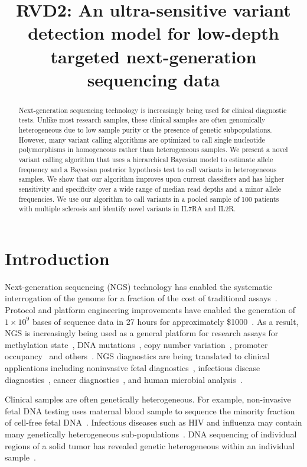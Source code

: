 \documentclass[11pt,reqno]{amsart}
\title[RVD2]{RVD2: An ultra-sensitive variant detection model for low-depth targeted next-generation sequencing data}
\author{}
\begin{document}
\begin{abstract}
Next-generation sequencing technology is increasingly being used for clinical diagnostic tests. Unlike most research samples, these clinical samples are often genomically heterogeneous due to low sample purity or the presence of genetic subpopulations. However, many variant calling algorithms are optimized to call single nucleotide polymorphisms in homogeneous rather than heterogeneous samples. We present a novel variant calling algorithm that uses a hierarchical Bayesian model to estimate allele frequency and a Bayesian posterior hypothesis test to call variants in heterogeneous samples. We show that our algorithm improves upon current classifiers and has higher sensitivity and specificity over a wide range of median read depths and a minor allele frequencies. We use our algorithm to call variants in a pooled sample of 100 patients with multiple sclerosis and identify novel variants in IL7RA and IL2R.
\end{abstract}

\maketitle

\section{Introduction}

Next-generation sequencing (NGS) technology has enabled the systematic interrogation of the genome for a fraction of the cost of traditional assays~\citep{Koboldt:2013kw}. Protocol and platform engineering improvements have enabled the generation of $1\times10^9$ bases of sequence data in 27 hours for approximately \$1000~\citep{Quail:2012hf}. As a result, NGS is increasingly being used as a general platform for research assays for methylation state~\citep{Laird:2010ab}, DNA mutations~\citep{Consortium:2013co}, copy number variation~\citep{Alkan:2009cr}, promoter occupancy~\citep{Ouyang:2009hc} and others~\citep{Rivera:2013ee}. NGS diagnostics are being translated to clinical applications including noninvasive fetal diagnostics~\citep{Kitzman:2012hea}, infectious disease diagnostics~\citep{Capobianchi:2012em}, cancer diagnostics~\citep{Navin:2010gu}, and human microbial analysis~\citep{Consortium:2013iz}. 

Clinical samples are often genetically heterogeneous. For example, non-invasive fetal DNA testing uses maternal blood sample to sequence the minority fraction of cell-free fetal DNA~\citep{Fan:2008di}. Infectious diseases such as HIV and influenza may contain many genetically heterogeneous sub-populations~\citep{Flaherty:2011ja, Ghedin:2010ie}. DNA sequencing of individual regions of a solid tumor has revealed genetic heterogeneous within an individual sample~\citep{Navin:2010gu}.  
\end{document}
